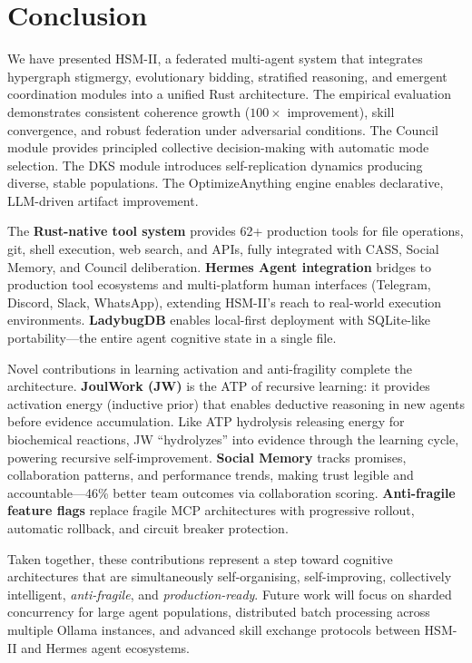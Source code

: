 \documentclass[11pt]{article}
\begin{document}
\section{Conclusion}
\nopagebreak[4]
\label{sec:conclusion}

We have presented HSM-II, a federated multi-agent system that integrates hypergraph
stigmergy, evolutionary bidding, stratified reasoning, and emergent
coordination modules into a unified Rust architecture. The empirical evaluation
demonstrates consistent coherence growth ($100\times$ improvement), skill
convergence, and robust federation under adversarial conditions. The Council module
provides principled collective decision-making with automatic mode selection.
The DKS module introduces self-replication dynamics producing diverse, stable
populations. The OptimizeAnything engine enables declarative, LLM-driven artifact
improvement.

The \textbf{Rust-native tool system} provides 62+ production tools for file
operations, git, shell execution, web search, and APIs, fully integrated with
CASS, Social Memory, and Council deliberation. \textbf{Hermes Agent integration}
bridges to production tool ecosystems and multi-platform human interfaces
(Telegram, Discord, Slack, WhatsApp), extending HSM-II's reach to real-world
execution environments. \textbf{LadybugDB} enables local-first deployment with
SQLite-like portability---the entire agent cognitive state in a single file.

Novel contributions in learning activation and anti-fragility complete the
architecture. \textbf{JoulWork (JW)} is the ATP of recursive learning:
it provides activation energy (inductive prior) that enables deductive reasoning
in new agents before evidence accumulation. Like ATP hydrolysis releasing energy
for biochemical reactions, JW ``hydrolyzes'' into evidence through the learning
cycle, powering recursive self-improvement. \textbf{Social Memory} tracks
promises, collaboration patterns, and performance trends, making trust legible
and accountable---46\% better team outcomes via collaboration scoring.
\textbf{Anti-fragile feature flags} replace fragile MCP architectures with
progressive rollout, automatic rollback, and circuit breaker protection.

Taken together, these contributions represent a step toward cognitive architectures
that are simultaneously self-organising, self-improving, collectively
intelligent, \emph{anti-fragile}, and \emph{production-ready}. Future work will
focus on sharded concurrency for large agent populations, distributed batch
processing across multiple Ollama instances, and advanced skill exchange protocols
between HSM-II and Hermes agent ecosystems.
\end{document}
